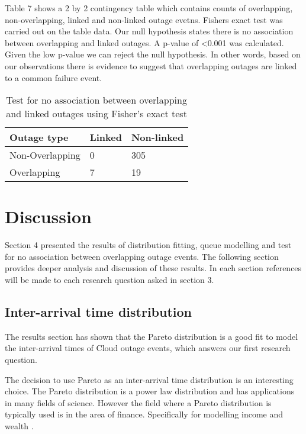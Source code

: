 \documentclass[5p]{elsarticle}
\begin{document}
Table 7 shows a 2 by 2 contingency table which contains counts of overlapping, non-overlapping, linked and non-linked outage evetns. Fishers exact test was carried out on the table data. Our null hypothesis states there is no association between overlapping and linked outages. A p-value of \textless 0.001 was calculated. Given the low p-value we can reject the null hypothesis. In other words, based on our observations there is evidence to suggest that overlapping outages are linked to a common failure event.

\begin {table}
\caption {Test for no association between overlapping and linked outages using Fisher's exact test} 
\begin{center}
\begin{tabular}{p{2.7cm} |  p{1.1cm} | p{2cm}} \hline \bf{Outage type} & \bf{Linked}  & \bf{Non-linked}
\\ \hline Non-Overlapping  & 0 & 305
\\ Overlapping & 7 & 19
\\ \hline
\end{tabular}
\end{center}
\end{table}

\section{Discussion}

Section 4 presented the results of distribution fitting, queue modelling and test for no association between overlapping outage events. The following section provides deeper analysis and discussion of these results. In each section references will be made to each research question asked in section 3. 

\subsection{Inter-arrival time distribution}

The results section has shown that the Pareto distribution is a good fit to model the inter-arrival times of Cloud outage events, which answers our first research question.

The decision to use Pareto as an inter-arrival time distribution is an interesting choice. The Pareto distribution is a power law distribution and has applications in many fields of science. However the field where a Pareto distribution is typically used is in the area of finance. Specifically for modelling income and wealth \cite{arnold2015pareto}. 
\end{document}
